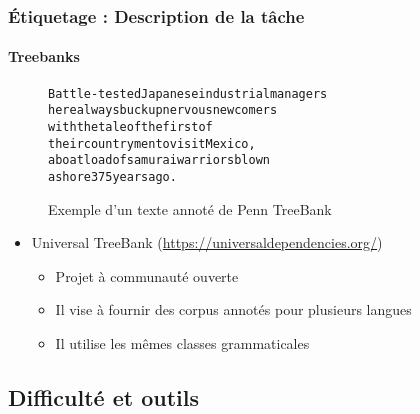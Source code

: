 \documentclass[xcolor=table]{beamer}
\begin{document}
\begin{frame}[fragile]
\frametitle{Étiquetage : Description de la tâche}
\framesubtitle{Treebanks}


\begin{figure}
	\begin{tcolorbox}[colback=white, colframe=blue, boxrule=1pt, text width=.9\textwidth]
		\small
\begin{alltt}
Battle-tested Japanese industrial managers
here always buck up nervous newcomers
with the tale of the first of
their countrymen to visit Mexico ,\keyword{/,}
a boatload of samurai warriors blown
ashore 375 years ago .
\end{alltt}
\end{tcolorbox}
\caption{Exemple d'un texte annoté de Penn TreeBank \cite{2003-taylor}}
\end{figure}

\begin{itemize}
	\item Universal TreeBank (\url{https://universaldependencies.org/}) \cite{2012-petrov-al}
	\begin{itemize}
		\item Projet à communauté ouverte
		\item Il vise à fournir des corpus annotés pour plusieurs langues
		\item Il utilise les mêmes classes grammaticales
	\end{itemize}
\end{itemize}

\end{frame}

\subsection{Difficulté et outils}
\end{document}
